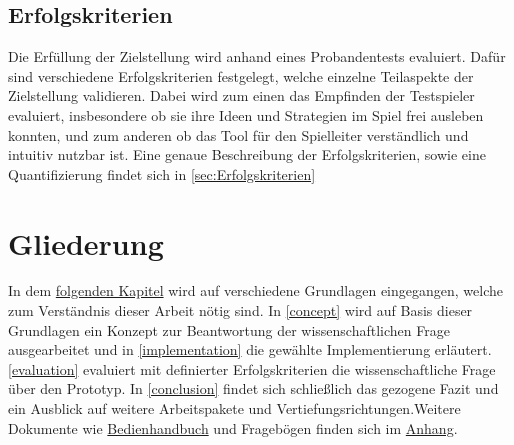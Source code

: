 \subsection{Erfolgskriterien}
\label{sec:Erfolgskriterien_ziel}

Die Erfüllung der Zielstellung wird anhand eines Probandentests evaluiert. Dafür sind verschiedene Erfolgskriterien festgelegt, welche einzelne Teilaspekte der Zielstellung validieren. Dabei wird zum einen das Empfinden der Testspieler evaluiert, insbesondere ob sie ihre Ideen und Strategien im Spiel frei ausleben konnten, und zum anderen ob das Tool für den  Spielleiter verständlich und intuitiv nutzbar ist. Eine genaue Beschreibung der Erfolgskriterien, sowie eine Quantifizierung findet sich in \ref{sec:Erfolgskriterien}

  
\section{Gliederung}
\label{sec:Gliederung}
In dem \hyperref[background]{folgenden Kapitel} wird auf verschiedene Grundlagen eingegangen, welche zum Verständnis dieser Arbeit nötig sind. In \ref{concept} wird auf Basis dieser Grundlagen ein Konzept zur Beantwortung der wissenschaftlichen Frage ausgearbeitet und in \ref{implementation} die gewählte Implementierung erläutert.\newline \ref{evaluation} evaluiert mit definierter Erfolgskriterien die wissenschaftliche Frage über den Prototyp. In \ref{conclusion} findet sich schließlich das gezogene Fazit und ein Ausblick auf weitere Arbeitspakete und Vertiefungsrichtungen.\newline Weitere Dokumente wie \hyperlink{AppendixManual.1}{Bedienhandbuch} und Fragebögen finden sich im \hyperlink{AppendixFragebogenA.1}{Anhang}.

